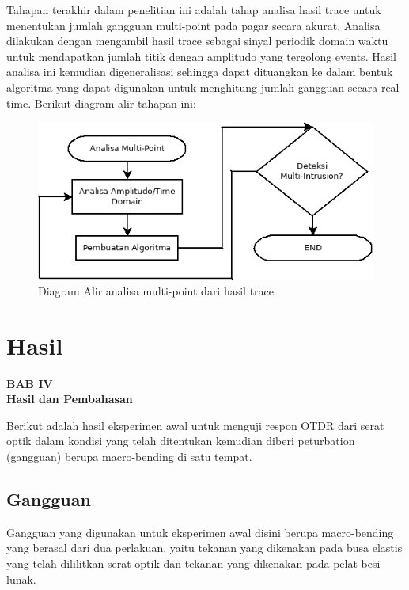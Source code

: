 \documentclass[12pt]{article}
\begin{document}
	Tahapan terakhir dalam penelitian ini adalah tahap analisa hasil trace untuk menentukan jumlah gangguan multi-point pada pagar secara akurat.
	Analisa dilakukan dengan mengambil hasil trace sebagai sinyal periodik domain waktu untuk mendapatkan jumlah titik dengan amplitudo yang tergolong events.
	Hasil analisa ini kemudian digeneralisasi sehingga dapat dituangkan ke dalam bentuk algoritma yang dapat digunakan untuk menghitung jumlah gangguan secara real-time.
	Berikut diagram alir tahapan ini:
	
	\begin{figure}[h!]
		\centering
		\captionsetup{justification=centering}
		\includegraphics[width=0.8\linewidth]{images/Bab_3/Bab_3_8}
		\caption[Diagram Alir]{\small{Diagram Alir analisa multi-point dari hasil trace}}
	\end{figure}
	
\newpage

	\setcounter{figure}{0}
	
	\section{Hasil}
	
	\begin{center}
		{\large \textbf{BAB IV}} \\
		{\large \textbf{Hasil dan Pembahasan}}
	\end{center}

	Berikut adalah hasil eksperimen awal untuk menguji respon OTDR dari serat optik dalam kondisi yang telah ditentukan kemudian diberi peturbation (gangguan) berupa macro-bending di satu tempat.
	
	\subsection{Gangguan}
	
	Gangguan yang digunakan untuk eksperimen awal disini berupa macro-bending yang berasal dari dua perlakuan, yaitu tekanan yang dikenakan pada busa elastis yang telah dililitkan serat optik dan tekanan yang dikenakan pada pelat besi lunak.
	
\end{document}
